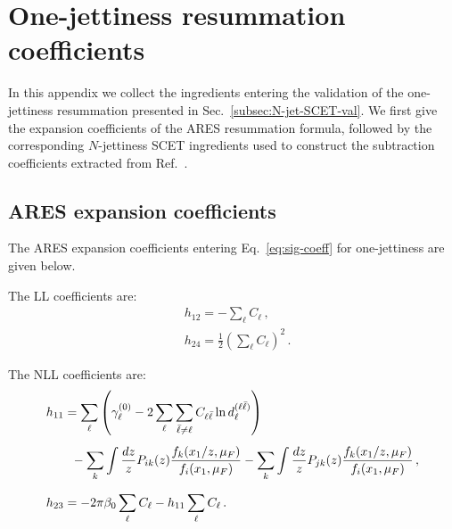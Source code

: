 \chapter{One-jettiness resummation coefficients}
\label{ap:ARES-coeff}

In this appendix we collect the ingredients entering the validation of
the one-jettiness resummation presented in Sec.~\ref{subsec:N-jet-SCET-val}.
We first give the expansion coefficients of the \textsc{ARES} resummation
formula, followed by the corresponding $N$-jettiness SCET ingredients
used to construct the subtraction coefficients extracted from Ref.~\cite{Gaunt:2015pea}.

\section{ARES expansion coefficients}
The \textsc{ARES} expansion coefficients entering Eq.~\eqref{eq:sig-coeff}
for one-jettiness are given below.

The LL coefficients are:
\begin{subequations}
\begin{align}
\label{eq:h12}
&h_{12} =-\sum_{\ell}C_{\ell}\,,\\[1ex]
\label{eq:h24}
&h_{24}=\frac{1}{2}\left(\sum_{\ell}C_{\ell}\right)^2\,.
 \end{align}
\end{subequations}

The NLL coefficients are: 
\begin{subequations}
\begin{align}
\label{eq:h11}
&h_{11} = \sum_{\ell}\left(\gamma_{\ell}^{(0)}-2\sum_{\ell}\sum_{\bar\ell\neq\ell} C_{\ell\bar\ell}\ln  d^{(\ell\bar{\ell})}_\ell\right)\notag\\[1ex]
&\qquad-\sum_{k}\int\frac{dz}{z}P_{ik}(z)\frac{f_k(x_1/z,\mu_F)}{f_i(x_1,\mu_F)}-\sum_{k}\int\frac{dz}{z}P_{jk}(z)\frac{f_k(x_1/z,\mu_F)}{f_i(x_1,\mu_F)}\,,\\[1.5ex]
\label{eq:h23}
&h_{23}=-2\pi\beta_{0} \sum_{\ell}C_{\ell }-h_{11} \sum_{\ell}C_{\ell }\,.
 \end{align}
\end{subequations}

